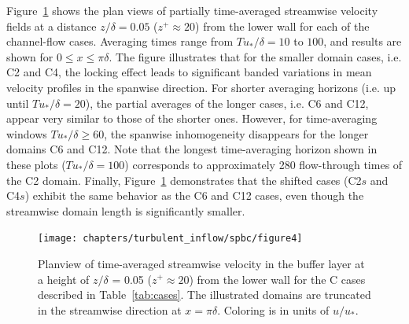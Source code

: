 		Figure~\ref{fig:topviewCHANNEL} shows the plan views of partially time-averaged streamwise velocity fields at a distance $z/\delta = 0.05$ ($z^+ \approx 20$) from the lower wall for each of the channel-flow cases. Averaging times range from $Tu_*/\delta=10$ to $100$, and results are shown for $0\leq x \leq \pi\delta$. The figure illustrates that for the smaller domain cases, i.e. C2 and C4, the locking effect leads to significant banded variations in mean velocity profiles in the spanwise direction. For shorter averaging horizons (i.e. up until $T u_* / \delta = 20$), the partial averages of the longer cases, i.e. C6 and C12, appear very similar to those of the shorter ones. However, for time-averaging windows $Tu_*/\delta \ge 60$, the spanwise inhomogeneity disappears for the longer domains C6 and C12. Note that the longest time-averaging horizon shown in these plots ($Tu_*/\delta=100$) corresponds to approximately 280 flow-through times of the C2 domain. Finally, Figure~\ref{fig:topviewCHANNEL} demonstrates that the shifted cases (C2$s$ and C4$s$) exhibit the same behavior as the C6 and C12 cases, even though the streamwise domain length is significantly smaller. 
		
		\begin{figure}
			\centering
			\texttt{[image: chapters/turbulent\_inflow/spbc/figure4]}
			\caption[Planview of time-averaged streamwise velocity in the buffer layer at a height of $z/\delta$ = 0.05 ($z^+ \approx 20$) from the lower wall for the C cases]{Planview of time-averaged streamwise velocity in the buffer layer at a height of $z/\delta$ = 0.05 ($z^+ \approx 20$) from the lower wall for the C cases described in Table~\ref{tab:cases}. The illustrated domains are truncated in the streamwise direction at $x = \pi\delta$. Coloring is in units of $u/u_*$.}
			\label{fig:topviewCHANNEL}
		\end{figure}
		
